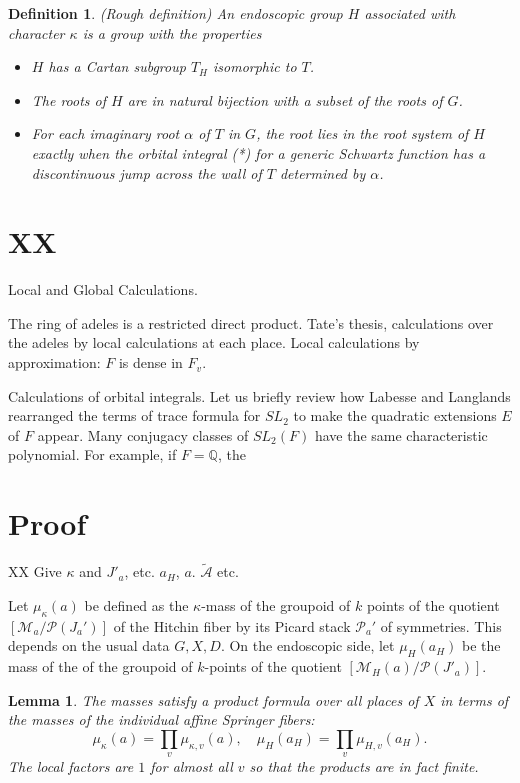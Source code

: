 \documentclass[brochure,english,12pt]{bourbaki}
\newtheorem{definition}[equation]{Definition}
\newtheorem{lemma}[equation]{Lemma}
\newcommand{\ring}[1]{\mathbb{#1}}
\def\M{{\mathcal M}}
\def\P{{\mathcal P}}
\def\tA{{\tilde{\mathcal A}}}
\begin{document}
\begin{definition}
(Rough definition)
An endoscopic group $H$ associated with character $\kappa$ is a group
with the properties
\begin{itemize}
\item $H$ has a Cartan subgroup $T_H$ isomorphic to $T$.
\item The roots of $H$ are in natural bijection with a subset of the roots of $G$.
\item For each imaginary root $\alpha$ of $T$ in $G$, the root
lies in the root system of $H$ exactly when the orbital integral (*)
for a generic Schwartz function has a discontinuous jump across 
the wall of $T$ determined by $\alpha$.
\end{itemize}
\end{definition}


\section{XX}
Local and Global Calculations.

The ring of adeles is a restricted direct product.  Tate's thesis,
calculations over the adeles by local calculations at each place.
Local calculations by approximation: $F$ is dense in $F_v$.


Calculations of orbital integrals.  Let us briefly review how Labesse
and Langlands rearranged the terms of trace formula for $SL_2$ to make
the quadratic extensions $E$ of $F$ appear.  Many conjugacy classes of
$SL_2(F)$ have the same characteristic polynomial.  For example, if
$F=\ring{Q}$, the

\section{Proof} %

XX Give $\kappa$ and $J'_a$, etc. $a_H$, $a$. $\tA$ etc.

Let $\mu_\kappa(a)$ be defined as the $\kappa$-mass of the groupoid of
$k$ points of the quotient $[\M_a/\P(J_a')]$ of the Hitchin fiber by
its Picard stack $\P_a'$ of symmetries.  This depends on the usual
data $G,X,D$.  On the endoscopic side, let $\mu_H(a_H)$ be the mass of
the of the groupoid of $k$-points of the quotient
$[\M_H(a)/\P(J'_a)]$.

\begin{lemma}  The masses satisfy a product formula over all places of $X$ in terms
of the masses of the individual affine Springer fibers:
\[
\mu_\kappa(a) =\prod_v \mu_{\kappa,v}(a), \quad \mu_H(a_H) = \prod_v \mu_{H,v}(a_H).
\]
The local factors are $1$ for almost all $v$ so that the products are in fact finite.
\end{lemma}
\end{document}
